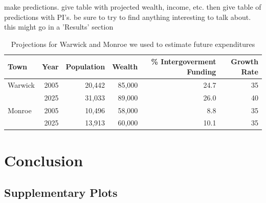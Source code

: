 \documentclass{article}\usepackage[]{graphicx}\usepackage[]{color}
\begin{document}
make predictions. give table with projected wealth, income, etc. then give table of predictions with PI's. be sure to try to find anything interesting to talk about. this might go in a 'Results' section

\begin{table}
\centering
\begin{tabular}{|l|rrrrr|}
\hline
Town & Year & Population & Wealth & \% Intergoverment Funding  & Growth Rate \\
\hline
Warwick & 2005 & 20,442 & 85,000 & 24.7 & 35 \\
        & 2025 & 31,033 & 89,000 & 26.0 & 40 \\
\hline
Monroe & 2005 & 10,496 & 58,000 & 8.8 & 35 \\
       & 2025 & 13,913 & 60,000 & 10.1 & 35 \\
\hline
\end{tabular}
\caption{Projections for Warwick and Monroe we used to estimate future expenditures}
\label{tab:projections}
\end{table}

\section{Conclusion} \label{conclusion}



\newpage
\begin{appendices}

\section{Supplementary Plots} \label{appendix_plots}

\end{appendices}
\end{document}
